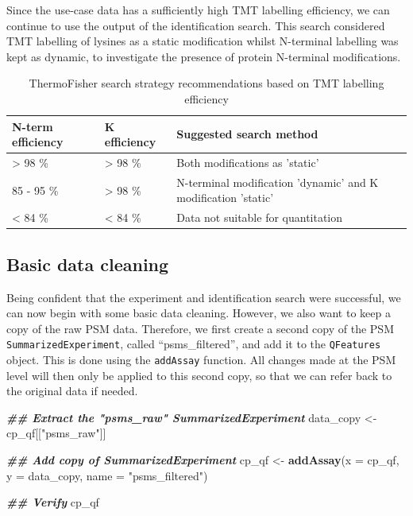 \documentclass[9pt,a4paper,]{extarticle}
\newenvironment{Shaded}{\begin{snugshade}}{\end{snugshade}}
\newcommand{\AttributeTok}[1]{\textcolor[rgb]{0.13,0.29,0.53}{#1}}
\newcommand{\DocumentationTok}[1]{\textcolor[rgb]{0.56,0.35,0.01}{\textbf{\textit{#1}}}}
\newcommand{\FunctionTok}[1]{\textcolor[rgb]{0.13,0.29,0.53}{\textbf{#1}}}
\newcommand{\NormalTok}[1]{#1}
\newcommand{\OtherTok}[1]{\textcolor[rgb]{0.56,0.35,0.01}{#1}}
\newcommand{\StringTok}[1]{\textcolor[rgb]{0.31,0.60,0.02}{#1}}
\begin{document}
Since the use-case data has a sufficiently high TMT labelling efficiency, we
can continue to use the output of the identification search. This search
considered TMT labelling of lysines as a static modification whilst N-terminal
labelling was kept as dynamic, to investigate the presence of protein N-terminal
modifications.

\begin{table}

\caption{\label{tab:table2}ThermoFisher search strategy recommendations based on TMT labelling efficiency}
\centering
\begin{tabular}[t]{l|l|l}
\hline
N-term efficiency & K efficiency & Suggested search method\\
\hline
> 98 \% & > 98 \% & Both modifications as 'static'\\
\hline
85 - 95 \% & > 98 \% & N-terminal modification 'dynamic' and K modification 'static'\\
\hline
< 84 \% & < 84 \% & Data not suitable for quantitation\\
\hline
\end{tabular}
\end{table}

\subsection{Basic data cleaning}\label{basic-data-cleaning}

Being confident that the experiment and identification search were successful,
we can now begin with some basic data cleaning. However, we also want to keep a
copy of the raw PSM data. Therefore, we first create a second copy of the PSM
\texttt{SummarizedExperiment}, called ``psms\_filtered'', and add it to the \texttt{QFeatures}
object. This is done using the \texttt{addAssay} function. All changes made at the PSM
level will then only be applied to this second copy, so that we can refer back
to the original data if needed.

\begin{Shaded}
\begin{Highlighting}[]
\DocumentationTok{\#\# Extract the "psms\_raw" SummarizedExperiment}
\NormalTok{data\_copy }\OtherTok{\textless{}{-}}\NormalTok{ cp\_qf[[}\StringTok{"psms\_raw"}\NormalTok{]]}

\DocumentationTok{\#\# Add copy of SummarizedExperiment}
\NormalTok{cp\_qf }\OtherTok{\textless{}{-}} \FunctionTok{addAssay}\NormalTok{(}\AttributeTok{x =}\NormalTok{ cp\_qf, }
                  \AttributeTok{y =}\NormalTok{ data\_copy,}
                  \AttributeTok{name =} \StringTok{"psms\_filtered"}\NormalTok{)}

\DocumentationTok{\#\# Verify}
\NormalTok{cp\_qf}
\end{Highlighting}
\end{Shaded}
\end{document}
